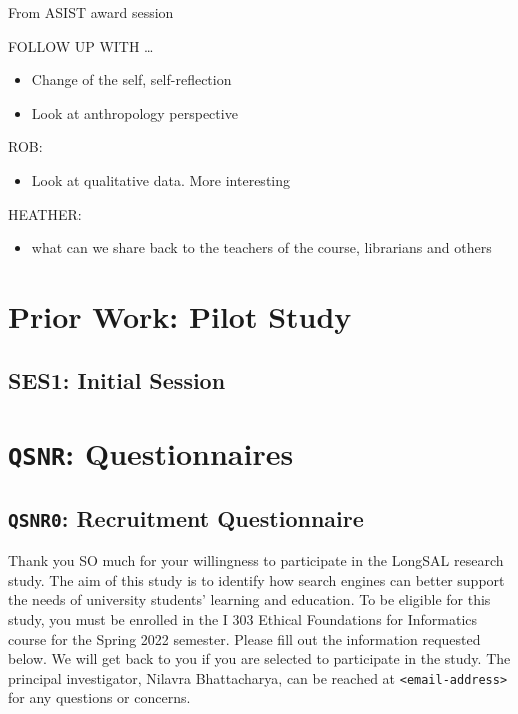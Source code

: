 \documentclass[letterpaper, nobind]{templates/ociamthesis}
\providecommand{\tightlist}{%
  \setlength{\itemsep}{0pt}\setlength{\parskip}{0pt}}
\begin{document}
From ASIST award session

FOLLOW UP WITH \ldots{}

\begin{itemize}
\tightlist
\item
  Change of the self, self-reflection
\item
  Look at anthropology perspective
\end{itemize}

ROB:

\begin{itemize}
\tightlist
\item
  Look at qualitative data. More interesting
\end{itemize}

HEATHER:

\begin{itemize}
\tightlist
\item
  what can we share back to the teachers of the course, librarians and others
\end{itemize}

\startappendices

\hypertarget{app-pilot-study}{%
\chapter{Prior Work: Pilot Study}\label{app-pilot-study}}

\hypertarget{ses1-initial-session}{%
\section{SES1: Initial Session}\label{ses1-initial-session}}

\hypertarget{app-qsnr}{%
\chapter{\texorpdfstring{\texttt{QSNR}: Questionnaires}{QSNR: Questionnaires}}\label{app-qsnr}}

\hypertarget{app-qsnr0}{%
\section{\texorpdfstring{\texttt{QSNR0}: Recruitment Questionnaire}{QSNR0: Recruitment Questionnaire}}\label{app-qsnr0}}

Thank you SO much for your willingness to participate in the LongSAL research study. The aim of this study is to identify how search engines can better support the needs of university students' learning and education. To be eligible for this study, you must be enrolled in the I 303 Ethical Foundations for Informatics course for the Spring 2022 semester. Please fill out the information requested below. We will get back to you if you are selected to participate in the study. The principal investigator, Nilavra Bhattacharya, can be reached at \texttt{\textless{}email-address\textgreater{}} for any questions or concerns.
\end{document}
